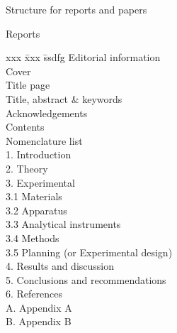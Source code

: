 \documentclass[a5paper, 10pt]{article}
\begin{document}
\begin{table}[htbp]
\begin{centering}
\caption{Structure for reports and papers}
\label{tab:format}
\begin{boxedminipage}[t]{0.4\textwidth}
  \begin{centering}Reports\\\end{centering}
  \begin{spacing}{1.8}
    \begin{tabbing}
      xxx \= xxx \= ssdfg \kill
      Editorial information                        \\
          \> Cover                                 \\
          \> Title page                            \\
          \> Title, abstract \& keywords \\
          \> Acknowledgements                      \\
          \> Contents                              \\
          \> Nomenclature list                     \\
      1.  \> Introduction                          \\
      2.  \> Theory                                \\
      3.  \> Experimental                          \\
      3.1 \> Materials                             \\
      3.2 \> Apparatus                             \\
      3.3 \> Analytical instruments                \\
      3.4 \> Methods                               \\
      3.5 \> Planning (or Experimental design)     \\
      4.  \> Results and discussion                \\
      5.  \> Conclusions and recommendations       \\
      6.  \> References                            \\
      A.  \> Appendix A                            \\
      B.  \> Appendix B                            
    \end{tabbing}
  \end{spacing}
\end{boxedminipage}
\begin{boxedminipage}[t]{0.4\textwidth}

\end{boxedminipage}
\end{centering}
\end{table}
\end{document}
